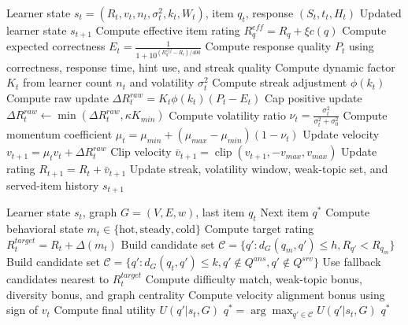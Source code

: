 \begin{algorithm}[t]
\caption{MARS Momentum-Aware Rating Update}
\label{alg:mars_update}
\begin{algorithmic}[1]
\REQUIRE Learner state $s_t=(R_t,v_t,n_t,\sigma_t^2,k_t,W_t)$, item $q_t$, response $(S_t,t_t,H_t)$
\ENSURE Updated learner state $s_{t+1}$
\STATE Compute effective item rating $R_q^{eff}=R_q+\xi c(q)$
\STATE Compute expected correctness $E_t=\frac{1}{1+10^{(R_q^{eff}-R_t)/400}}$
\STATE Compute response quality $P_t$ using correctness, response time, hint use, and streak quality
\STATE Compute dynamic factor $K_t$ from learner count $n_t$ and volatility $\sigma_t^2$
\STATE Compute streak adjustment $\phi(k_t)$
\STATE Compute raw update $\Delta R_t^{raw}=K_t\phi(k_t)(P_t-E_t)$
    \STATE Cap positive update $\Delta R_t^{raw} \leftarrow \min(\Delta R_t^{raw}, \kappa K_{min})$
\ENDIF
\STATE Compute volatility ratio $\nu_t=\frac{\sigma_t^2}{\sigma_t^2+\sigma_0^2}$
\STATE Compute momentum coefficient $\mu_t=\mu_{min}+(\mu_{max}-\mu_{min})(1-\nu_t)$
\STATE Update velocity $v_{t+1}=\mu_t v_t+\Delta R_t^{raw}$
\STATE Clip velocity $\bar{v}_{t+1}=\operatorname{clip}(v_{t+1},-v_{max},v_{max})$
\STATE Update rating $R_{t+1}=R_t+\bar{v}_{t+1}$
\STATE Update streak, volatility window, weak-topic set, and served-item history
\RETURN $s_{t+1}$
\end{algorithmic}
\end{algorithm}

\begin{algorithm}[t]
\caption{MARS Graph-Aware Recommendation}
\label{alg:mars_recommend}
\begin{algorithmic}[1]
\REQUIRE Learner state $s_t$, graph $G=(V,E,w)$, last item $q_t$
\ENSURE Next item $q^*$
\STATE Compute behavioral state $m_t \in \{\text{hot},\text{steady},\text{cold}\}$
\STATE Compute target rating $R_t^{target}=R_t+\Delta(m_t)$
    \STATE Build candidate set $\mathcal{C}=\{q':d_G(q_m,q')\le h, R_{q'}<R_{q_m}\}$
\ELSE
    \STATE Build candidate set $\mathcal{C}=\{q':d_G(q_t,q')\le k, q'\notin Q^{ans}, q'\notin Q^{srv}\}$
\ENDIF
{}
    \STATE Use fallback candidates nearest to $R_t^{target}$
\ENDIF
{}
    \STATE Compute difficulty match, weak-topic bonus, diversity bonus, and graph centrality
    \STATE Compute velocity alignment bonus using sign of $v_t$
    \STATE Compute final utility $U(q'|s_t,G)$
\ENDFOR
\STATE $q^*=\arg\max_{q'\in\mathcal{C}} U(q'|s_t,G)$
\RETURN $q^*$
\end{algorithmic}
\end{algorithm}
